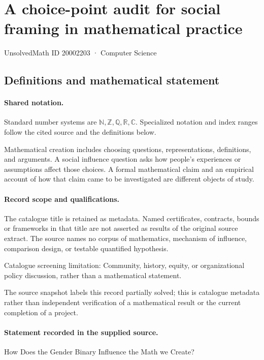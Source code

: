 \documentclass[11pt]{article}
\begin{document}
\setcounter{section}{20002202}
\section{A choice-point audit for social framing in mathematical practice}\label{20002203}
{\small\sffamily UnsolvedMath ID 20002203 · Computer Science}
\subsection{Definitions and mathematical statement}

\paragraph{Shared notation.}Standard number systems are $\mathbb N,\mathbb Z,\mathbb Q,\mathbb R,\mathbb C$. Specialized notation and index ranges follow the cited source and the definitions below.


Mathematical creation includes choosing questions, representations, definitions, and arguments. A social influence question asks how people's experiences or assumptions affect those choices. A formal mathematical claim and an empirical account of how that claim came to be investigated are different objects of study.
\paragraph{Record scope and qualifications.}
The catalogue title is retained as metadata. Named certificates, contracts, bounds or frameworks in that title are not asserted as results of the original source extract.
The source names no corpus of mathematics, mechanism of influence, comparison design, or testable quantified hypothesis.

Catalogue screening limitation: Community, history, equity, or organizational policy discussion, rather than a mathematical statement.

The source snapshot labels this record partially solved; this is catalogue metadata rather than independent verification of a mathematical result or the current completion of a project.
\paragraph{Statement recorded in the supplied source.}
How Does the Gender Binary Influence the Math we Create?
\end{document}
